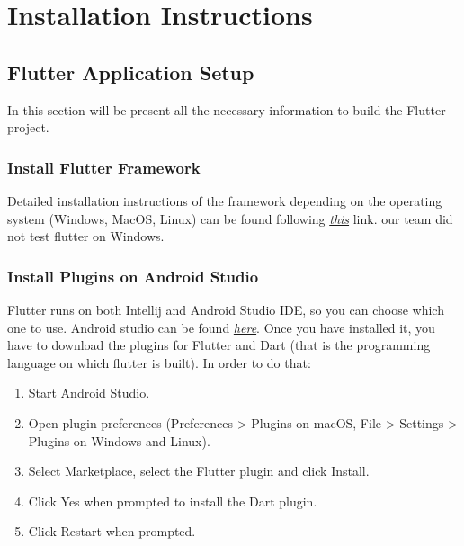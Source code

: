 \documentclass[../ITD.tex]{subfiles}
\begin{document}
    \chapter{Installation Instructions}\label{ch:installation-instructions}
\section{Flutter Application Setup}\label{sec:flutter-application-setup}
In this section will be present all the necessary information to build the
Flutter project.
\subsection{Install Flutter Framework}\label{subsec:install-flutter-framework}
Detailed installation instructions of the framework depending on the operating system (Windows, MacOS, Linux)
    can be found following
    \href{https://flutter.dev/docs/get-started/install}{\textit{this}} link.
    our team did not test flutter on Windows.
\subsection{Install Plugins on Android Studio}\label{subsec:install-plugins-on-android-studio}
    Flutter runs on both Intellij and Android Studio IDE, so you can choose which one to use.
    Android studio can be found \href{https://developer.android.com/studio}{\textit{here}}.
    Once you have installed it, you have to download the plugins for Flutter and Dart (that is the programming language on which flutter is built).
    In order to do that:
    \begin{enumerate}
        \item Start Android Studio.
        \item Open plugin preferences (Preferences > Plugins on macOS, File > Settings > Plugins on Windows and Linux).
        \item Select Marketplace, select the Flutter plugin and click Install.
        \item Click Yes when prompted to install the Dart plugin.
        \item Click Restart when prompted.
    \end{enumerate}
\end{document}
